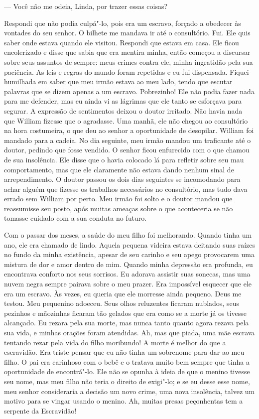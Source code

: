 --- Você não me odeia, Linda, por trazer essas coisas?

Respondi que não podia culpá"-lo, pois era um escravo, forçado a obedecer
às vontades do seu senhor. O bilhete me mandava ir até o consultório.
Fui. Ele quis saber onde estava quando ele visitou. Respondi que estava
em casa. Ele ficou encolerizado e disse que sabia que era mentira minha,
então começou a discursar sobre seus assuntos de sempre: meus crimes
contra ele, minha ingratidão pela sua paciência. As leis e regras do
mundo foram repetidas e eu fui dispensada. Fiquei humilhada em saber que
meu irmão estava ao meu lado, tendo que escutar palavras que se dizem
apenas a um escravo. Pobrezinho! Ele não podia fazer nada para me
defender, mas eu ainda vi as lágrimas que ele tanto se esforçava para
segurar. A expressão de sentimentos deixou o doutor irritado. Não havia
nada que William fizesse que o agradasse. Uma manhã, ele não chegou ao
consultório na hora costumeira, o que deu ao senhor a oportunidade de
desopilar. William foi mandado para a cadeia. No dia seguinte, meu irmão
mandou um traficante até o doutor, pedindo que fosse vendido. O senhor
ficou enfurecido com o que chamou de sua insolência. Ele disse que o
havia colocado lá para refletir sobre seu mau comportamento, mas que ele
claramente não estava dando nenhum sinal de arrependimento. O doutor
passou os dois dias seguintes se incomodando para achar alguém que
fizesse os trabalhos necessários no consultório, mas tudo dava errado
sem William por perto. Meu irmão foi solto e o doutor mandou que
reassumisse seu posto, após muitas ameaças sobre o que aconteceria se
não tomasse cuidado com a sua conduta no futuro.

Com o passar dos meses, a saúde do meu
filho foi melhorando. Quando tinha um ano, ele era chamado de lindo.
Aquela pequena videira estava deitando suas raízes no fundo da minha
existência, apesar de seu carinho e seu apego provocarem uma mistura de
dor e amor dentro de mim. Quando minha depressão era profunda, eu
encontrava conforto nos seus sorrisos. Eu adorava assistir suas sonecas,
mas uma nuvem negra sempre pairava sobre o meu prazer. Era impossível
esquecer que ele era um escravo. Às vezes, eu queria que ele morresse
ainda pequeno. Deus me testou. Meu pequenino adoeceu. Seus olhos
reluzentes ficaram nublados, seus pezinhos e mãozinhas ficaram tão
gelados que era como se a morte já os tivesse alcançado. Eu rezara pela
sua morte, mas nunca tanto quanto agora rezava pela sua vida, e minhas
orações foram atendidas. Ah, mas que piada, uma mãe escrava tentando
rezar pela vida do filho moribundo! A morte é melhor do que a
escravidão. Era triste pensar que eu não tinha um sobrenome para dar ao
meu filho. O pai era carinhoso com o bebê e o tratava muito bem sempre
que tinha a oportunidade de encontrá"-lo. Ele não se opunha à ideia de
que o menino tivesse seu nome, mas meu filho não teria o direito de
exigi"-lo; e se eu desse esse nome, meu senhor consideraria a decisão um
novo crime, uma nova insolência, talvez um motivo para se vingar usando
o menino. Ah, muitas presas peçonhentas tem a serpente da Escravidão!

